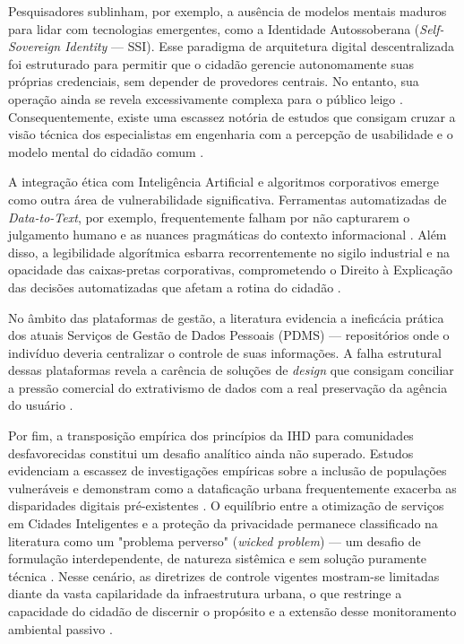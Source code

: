 \documentclass[12pt]{article}
\begin{document}
Pesquisadores sublinham, por exemplo, a ausência de modelos mentais maduros para lidar com tecnologias emergentes, como a Identidade Autossoberana (\textit{Self-Sovereign Identity} — SSI). Esse paradigma de arquitetura digital descentralizada foi estruturado para permitir que o cidadão gerencie autonomamente suas próprias credenciais, sem depender de provedores centrais. No entanto, sua operação ainda se revela excessivamente complexa para o público leigo \cite{Lockwood2021, Lockwood2020AnAccessible}. Consequentemente, existe uma escassez notória de estudos que consigam cruzar a visão técnica dos especialistas em engenharia com a percepção de usabilidade e o modelo mental do cidadão comum \cite{Capeleti2024Human}.

A integração ética com Inteligência Artificial e algoritmos corporativos emerge como outra área de vulnerabilidade significativa. Ferramentas automatizadas de \textit{Data-to-Text}, por exemplo, frequentemente falham por não capturarem o julgamento humano e as nuances pragmáticas do contexto informacional \cite{ferreira2024connecting}. Além disso, a legibilidade algorítmica esbarra recorrentemente no sigilo industrial e na opacidade das caixas-pretas corporativas, comprometendo o Direito à Explicação das decisões automatizadas que afetam a rotina do cidadão \cite{Coleti2020TR, Barreto2018}.

No âmbito das plataformas de gestão, a literatura evidencia a ineficácia prática dos atuais Serviços de Gestão de Dados Pessoais (PDMS) — repositórios onde o indivíduo deveria centralizar o controle de suas informações. A falha estrutural dessas plataformas revela a carência de soluções de \textit{design} que consigam conciliar a pressão comercial do extrativismo de dados com a real preservação da agência do usuário \cite{angelopoulos2021stewardship, Crabtree2016}.

Por fim, a transposição empírica dos princípios da IHD para comunidades desfavorecidas constitui um desafio analítico ainda não superado. Estudos evidenciam a escassez de investigações empíricas sobre a inclusão de populações vulneráveis e demonstram como a dataficação urbana frequentemente exacerba as disparidades digitais pré-existentes \cite{hayes2024making, Locoro2020}. O equilíbrio entre a otimização de serviços em Cidades Inteligentes e a proteção da privacidade permanece classificado na literatura como um "problema perverso" (\textit{wicked problem}) — um desafio de formulação interdependente, de natureza sistêmica e sem solução puramente técnica \cite{Meireles2016, Chowdhury2016}. Nesse cenário, as diretrizes de controle vigentes mostram-se limitadas diante da vasta capilaridade da infraestrutura urbana, o que restringe a capacidade do cidadão de discernir o propósito e a extensão desse monitoramento ambiental passivo \cite{Mashhadi2014}.
\end{document}
